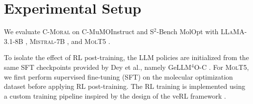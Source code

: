 \documentclass[11pt]{article}
\begin{document}



\section{Experimental Setup}

We evaluate \textsc{C-Moral} on C-MuMOInstruct \cite{dey2025large} and S$^2$-Bench MolOpt \cite{li2025speaktostructureevaluatingllmsopendomain} with \textsc{LLaMA}-3.1-8B \cite{touvron2023llamaopenefficientfoundation}, \textsc{Mistral}-7B \cite{jiang2023mistral7b}, and \textsc{MolT5} \cite{edwards2022translationmoleculesnaturallanguage}.

To isolate the effect of RL post-training, the LLM policies are initialized from the same SFT checkpoints provided by Dey et al., namely GeLLM$^4$O-C \cite{dey2025large}. For \textsc{MolT5}, we first perform supervised fine-tuning (SFT) on the molecular optimization dataset before applying RL post-training. The RL training is implemented using a custom training pipeline inspired by the design of the veRL framework \cite{Sheng_2025}.
\end{document}

